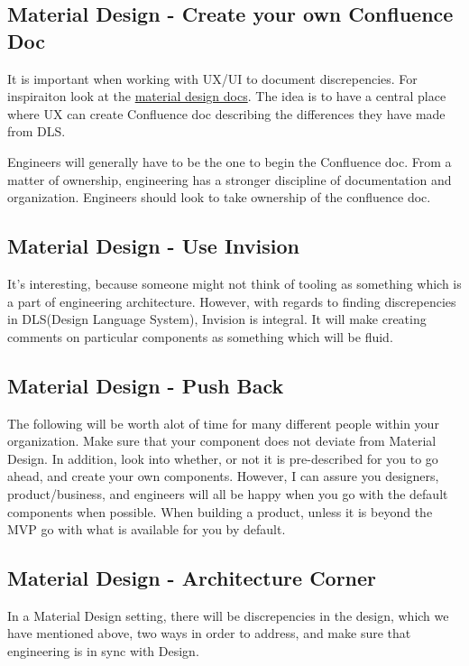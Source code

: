 \subsection{ Material Design - Create your own Confluence Doc }

It is important when working with UX/UI to document discrepencies. For
inspiraiton look at the \href{https://material.io/guidelines/components/sliders.html}{material design docs}.
The idea is to have a central place where UX can create Confluence doc
describing the differences they have made from DLS.

Engineers will generally have to be the one to begin the Confluence doc. From a
matter of ownership, engineering has a stronger discipline of documentation and
organization. Engineers should look to take ownership of the confluence doc.

\subsection{ Material Design - Use Invision }
It's interesting, because someone might not think of tooling as something which
is a part of engineering architecture. However, with regards to finding
discrepencies in DLS(Design Language System), Invision is integral. It will
make creating comments on particular components as something which will be fluid.

\subsection{ Material Design - Push Back }
The following will be worth alot of time for many different people within your
organization. Make sure that your component does not deviate from Material
Design. In addition, look into whether, or not it is pre-described for you to
go ahead, and create your own components. However, I can assure you designers,
product/business, and engineers will all be happy when you go with the default
components when possible. When building a product, unless it is beyond the MVP
go with what is available for you by default.

\subsection{ Material Design - Architecture Corner }
In a Material Design setting, there will be discrepencies in the design, which
we have mentioned above, two ways in order to address, and make sure that
engineering is in sync with Design.

